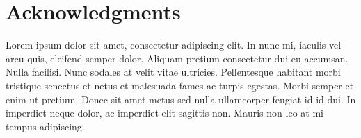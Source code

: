 
\cleardoublepage
\pagestyle{empty}
\begin{abstractpage}

\end{abstractpage}

% 

\cleardoublepage


\section*{Acknowledgments}

Lorem ipsum dolor sit amet, consectetur adipiscing elit. In nunc mi, iaculis vel arcu quis, eleifend semper dolor. Aliquam pretium consectetur dui eu accumsan. Nulla facilisi. Nunc sodales at velit vitae ultricies. Pellentesque habitant morbi tristique senectus et netus et malesuada fames ac turpis egestas. Morbi semper et enim ut pretium. Donec sit amet metus sed nulla ullamcorper feugiat id id dui. In imperdiet neque dolor, ac imperdiet elit sagittis non. Mauris non leo at mi tempus adipiscing.
\cleardoublepage
